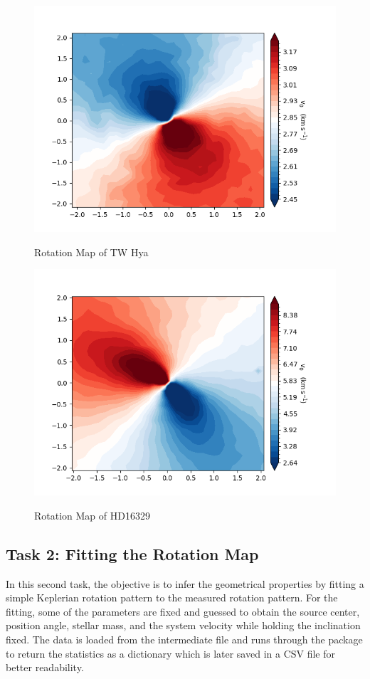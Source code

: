\documentclass{article}
\begin{document}
\begin{figure}
\caption{Rotation Map of TW Hya}
\includegraphics[width=\textwidth,height=\textheight,keepaspectratio]{TWHya_Rotate.png}
\label{fig:fig 3}
\end{figure}

\begin{figure}
\caption{Rotation Map of HD16329}
\includegraphics[width=\textwidth,height=\textheight,keepaspectratio]{HD163296_Rotate.png}
\label{fig:fig 4}
\end{figure}

\subsection{Task 2: Fitting the Rotation Map}
In this second task, the objective is to infer the geometrical properties by fitting a simple Keplerian rotation pattern to the measured rotation pattern. For the fitting, some of the parameters are fixed and guessed to obtain the source center, position angle, stellar mass, and the system velocity while holding the inclination fixed. The data is loaded from the intermediate file and runs through the package to return the statistics as a dictionary which is later saved in a CSV file for better readability. 
\end{document}

